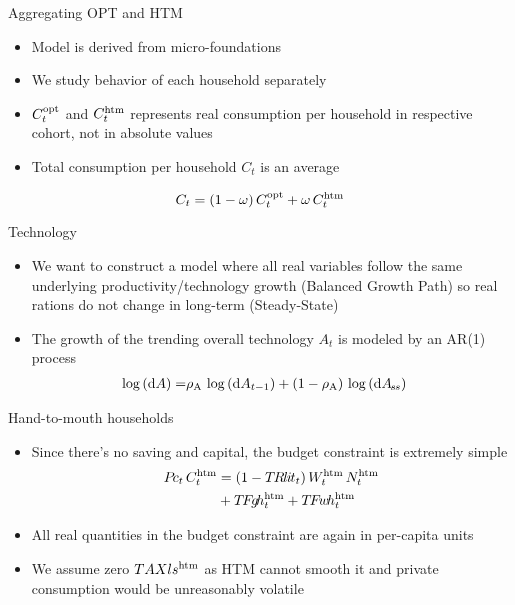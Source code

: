 \begin{frame}{Aggregating OPT and HTM}
  \begin{itemize}
    \item Model is derived from micro-foundations
    \item We study behavior of each household separately
    \item $C^{\text{opt}}_t$ and $C^{\text{htm}}_t$ represents real consumption per household in respective cohort, not in absolute values
    \item Total consumption per household $C_t$ is an average
  \end{itemize}
  \vspace*{-2mm}
  \begin{equation*}
    C_t = \left(1-\omega\right)C_t^{\text{opt}}+\omega\,C_t^{\text{htm}}
  \end{equation*}      
  
\end{frame}

\begin{frame}{Technology}
  \begin{itemize}
    \item We want to construct a model where all real variables follow the same underlying productivity/technology growth (Balanced Growth Path) so real rations do not change in long-term (Steady-State)
    \item The growth of the trending overall technology $A_t$ is modeled by an AR(1) process 
    \vspace{-3mm}
    \begin{align*}
      \log\left(\text{d} A\right)= & \rho_{\text{A}}\,\log\left(\text{d} A_{t-1}\right) + 
      \left(1-\rho_{\text{A}}\right)\,\log\left({\text{d} A}_{\hspace{-0.10em}s\hspace{-0.05em}s}\right)
    \end{align*}
  \end{itemize}
\end{frame}

\begin{frame}{Hand-to-mouth households}
  \begin{itemize}
    \item Since there's no saving and capital, the budget constraint is extremely simple
    \begin{align*}
      P\hspace{-0.15em}c_t \, C^{\text{htm}}_t & = \left(1 - T\hspace{-0.1em}R\hspace{-0.075em}l\hspace{-0.075em}i\hspace{-0.075em}t_t\right) W_t^{\text{htm}}\, N^{\text{htm}}_t \\
      & +  T\hspace{-0.125em}F\hspace{-0.15em}g\hspace{-0.15em}h^{\text{htm}}_t  + T\hspace{-0.125em}F\hspace{-0.15em}w\hspace{-0.15em}h^{\text{htm}}_t
    \end{align*}
    \item All real quantities in the budget constraint are again in per-capita units
    \item {We assume zero $TAXls^{\text{htm}}$ as HTM cannot smooth it and private consumption would be unreasonably volatile}
  \end{itemize} 
\end{frame}

